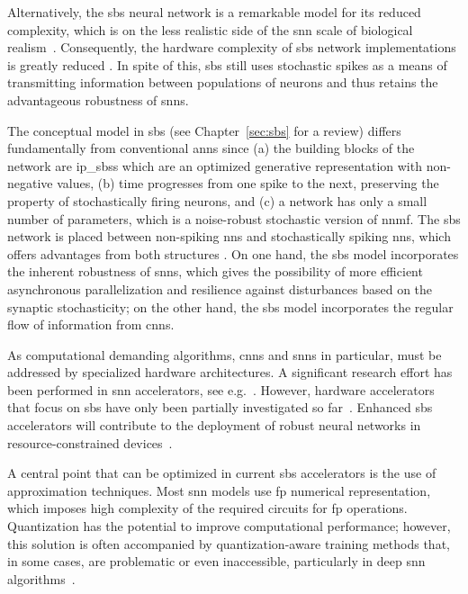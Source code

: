 	Alternatively, the \gls{sbs} neural network is a remarkable model for its reduced complexity, which is on the less realistic side of the \gls{snn} scale of biological realism~\cite{rotermund2019Backpropagation,ernst2007efficient}. Consequently, the hardware complexity of \gls{sbs} network implementations is greatly reduced
	\cite{nevarez2020accelerator,rotermund2018massively}. In spite of this, \gls{sbs} still uses stochastic spikes as a means of transmitting information between populations of neurons and thus retains the advantageous robustness of \glspl{snn}.


The conceptual model in \gls{sbs} (see Chapter~\ref{sec:sbs} for a review) differs fundamentally from conventional \glspl{ann} since (a) the building blocks of the network are \glspl{ip_sbs} which are an optimized generative representation with non-negative values, (b) time progresses from one spike to the next, preserving the property of stochastically firing neurons, and (c) a network has only a small number of parameters, which is a noise-robust stochastic version of \gls{nnmf}. The \gls{sbs} network is placed between non-spiking \glspl{nn} and stochastically spiking \glspl{nn}, which offers advantages from both structures \cite{rotermund2019Backpropagation}. On one hand, the \gls{sbs} model incorporates the inherent robustness of \glspl{snn}, which gives the possibility of more efficient asynchronous parallelization and resilience against disturbances based on the synaptic stochasticity; on the other hand, the \gls{sbs} model incorporates the regular flow of information from \glspl{cnn}.  


As computational demanding algorithms, \glspl{cnn} and \glspl{snn} in particular, must be addressed by specialized hardware architectures. A significant research effort has been performed in \gls{snn} accelerators, see e.g.~\cite{roy2019towards,bouvier2019spiking, young2019review,TrueNorth_Trans15,Spinnaker_Trans13,davies2018loihi}.
  However, hardware accelerators that focus on \gls{sbs} have only been partially investigated so far~\cite{rotermund2018massively}.
  Enhanced \gls{sbs} accelerators will contribute to the deployment of robust neural networks in resource-constrained devices~\cite{nevarez2020accelerator,ernst2007efficient,rotermund2019recurrentsbs, dayan2001theoretical}.

A central point that can be optimized in current \gls{sbs} accelerators
is the use of approximation techniques.
Most \gls{snn} models use \gls{fp}  numerical representation, which imposes high complexity of the required circuits for \gls{fp} operations. Quantization has the potential to improve computational performance; however, this solution is often accompanied by quantization-aware training methods that, in some cases, are problematic or even inaccessible, particularly in deep \gls{snn} algorithms~\cite{zhang2018survey}.

